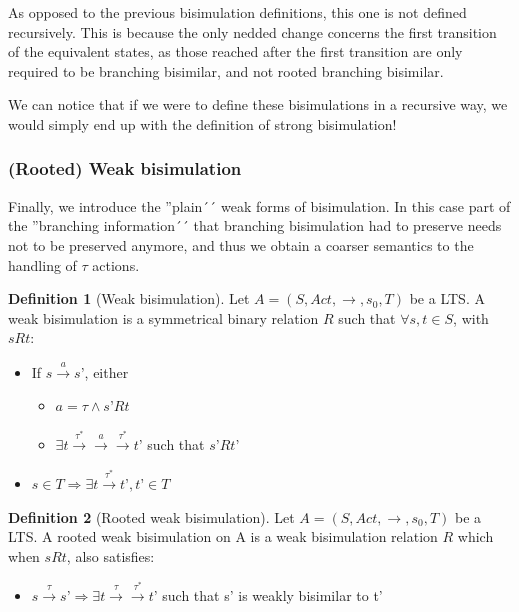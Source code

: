 \documentclass[11pt]{article}
\theoremstyle{definition}
\newtheorem{definition}{Definition}
\theoremstyle{plain}
\theoremstyle{definition}
\begin{document}
As opposed to the previous bisimulation definitions, this one is not defined recursively. This is because the only nedded change concerns the first transition of the equivalent states, as those reached after the first transition are only required to be branching bisimilar, and not rooted branching bisimilar.

We can notice that if we were to define these bisimulations in a recursive way, we would simply end up with the definition of strong bisimulation!

\subsubsection{(Rooted) Weak bisimulation}
Finally, we introduce the ''plain´´ weak forms of bisimulation. In this case part of the ''branching information´´ that branching bisimulation had to preserve needs not to be preserved anymore, and thus we obtain a coarser semantics to the handling of $ \tau $ actions.
\begin{definition} [Weak bisimulation]
	Let $ A = (S, Act, \rightarrow, s_0, T) $ be a LTS. A weak bisimulation is a symmetrical binary relation $ R $ such that $\forall s, t \in S$, with $ s R t $:
	\begin{itemize}
		\item If $ s\xrightarrow{a}s’ $, either
		\begin{itemize}
			\item $ a = \tau  \wedge s’ R t $
			\item $ \exists t\xrightarrow{\tau^*}\xrightarrow{a}\xrightarrow{\tau^*}t’ $ such that $ s’ R t’ $
		\end{itemize}
		\item $ s \in T \Rightarrow \exists t\xrightarrow{\tau^*}t’, t’ \in T $
	\end{itemize}
\end{definition}

\begin{definition} [Rooted weak bisimulation]
	Let $ A = (S, Act, \rightarrow, s_0, T) $ be a LTS. A rooted weak bisimulation on A is a weak bisimulation relation $ R $ which when $s R t$, also satisfies:
	\begin{itemize}
		\item $ s\xrightarrow{\tau}s’  \Rightarrow \exists  t\xrightarrow{\tau}\xrightarrow{\tau^*}t’ $ such that s’ is weakly bisimilar to t’
	\end{itemize}
\end{definition}
\end{document}
